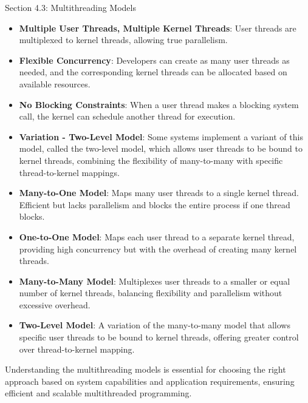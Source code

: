 \begin{notes}{Section 4.3: Multithreading Models}
\begin{highlight}
        \begin{itemize}
            \item \textbf{Multiple User Threads, Multiple Kernel Threads}: User threads are multiplexed to kernel threads, allowing true parallelism.
            \item \textbf{Flexible Concurrency}: Developers can create as many user threads as needed, and the corresponding kernel threads can be allocated based on available resources.
            \item \textbf{No Blocking Constraints}: When a user thread makes a blocking system call, the kernel can schedule another thread for execution.
            \item \textbf{Variation - Two-Level Model}: Some systems implement a variant of this model, called the two-level model, which allows user threads to be bound to kernel threads, combining the 
            flexibility of many-to-many with specific thread-to-kernel mappings.
        \end{itemize}
    
    \end{highlight}
    
    \begin{highlight}
    
        \begin{itemize}
            \item \textbf{Many-to-One Model}: Maps many user threads to a single kernel thread. Efficient but lacks parallelism and blocks the entire process if one thread blocks.
            \item \textbf{One-to-One Model}: Maps each user thread to a separate kernel thread, providing high concurrency but with the overhead of creating many kernel threads.
            \item \textbf{Many-to-Many Model}: Multiplexes user threads to a smaller or equal number of kernel threads, balancing flexibility and parallelism without excessive overhead.
            \item \textbf{Two-Level Model}: A variation of the many-to-many model that allows specific user threads to be bound to kernel threads, offering greater control over thread-to-kernel mapping.
        \end{itemize}
    
    Understanding the multithreading models is essential for choosing the right approach based on system capabilities and application requirements, ensuring efficient and scalable multithreaded programming.
    
    \end{highlight}
\end{notes}

